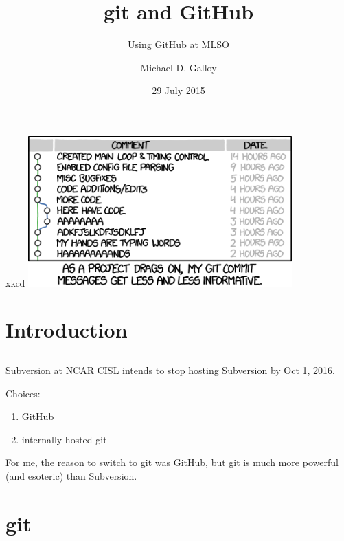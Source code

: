 \documentclass{beamer}
\title{git and GitHub}
\subtitle{Using GitHub at MLSO}
\author{Michael D. Galloy}
\institute[NCAR/MLSO]{NCAR/HAO --- MLSO}
\date{29 July 2015}
\begin{document}
\begin{frame}{xkcd}
  \includegraphics[width=4in]{git_commit.png}
\end{frame}

\begin{frame}[plain]
  \titlepage
\end{frame}


\section{Introduction}
\subsection*{}

\begin{frame}
  \tableofcontents
\end{frame}

\begin{frame}{Subversion at NCAR}
CISL intends to stop hosting Subversion by Oct 1, 2016.

\vspace{1em}

Choices:
  \begin{enumerate}
    \item GitHub
    \item internally hosted git
  \end{enumerate}
For me, the reason to switch to git was GitHub, but git is much more powerful (and esoteric) than Subversion.
\end{frame}


\section{git}
\end{document}
